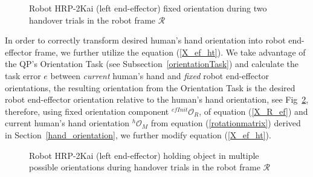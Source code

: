 \documentclass[a4paper, 12pt, oneside]{Thesis}  %
\begin{document}
\begin{figure}[ht]
	\caption{Robot HRP-2Kai (left end-effector) fixed orientation during two handover trials in the robot frame $\mathcal{R}$}
	\label{fig:robot_lt_hand_2layers}
\end{figure} 


In order to correctly transform desired human's hand orientation into robot end-effector frame, we further utilize the equation (\ref{X_ef_ht}). We take advantage of the QP's Orientation Task (see Subsection~\ref{orientationTask}) and calculate the task error $e$ between \textit{current} human's hand and \textit{fixed} robot end-effector orientations,
the resulting orientation from the Orientation Task is the desired robot end-effector orientation relative to the human's hand orientation, see Fig~\ref{fig:robot_lt_orientations}, therefore, using fixed orientation component  ${{}^{efInit}\mathcal{O}_R}$, of equation (\ref{X_R_ef}) and current human's hand orientation ${}^{h}\mathcal{O}_M$ from equation (\ref{rotationmatrix}) derived in Section~\ref{hand_orientation}, we further modify equation (\ref{X_ef_ht}).

\begin{figure}[ht]
	\caption{Robot HRP-2Kai (left end-effector) holding object in multiple possible orientations during handover trials in the robot frame $\mathcal{R}$}
	\label{fig:robot_lt_orientations}
\end{figure} 
\end{document}
